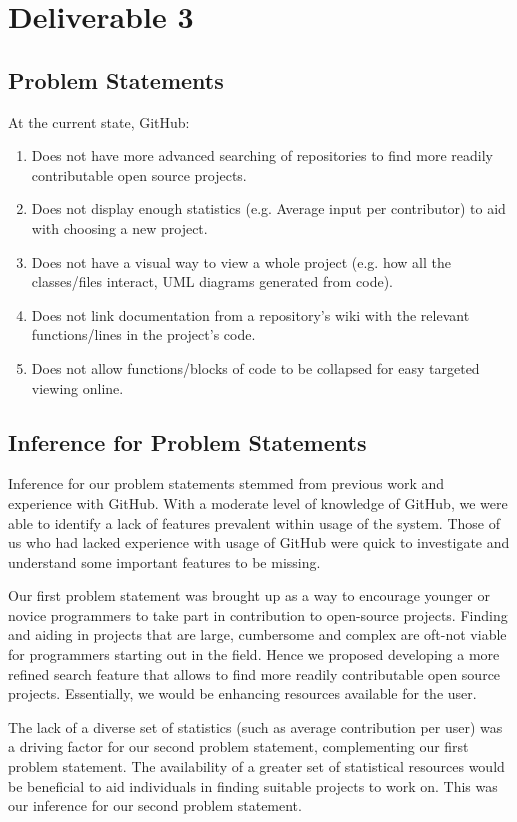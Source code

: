 \documentclass[12pt]{article}
\begin{document}
\setcounter{section}{3}
\setcounter{subsection}{0}
\section*{Deliverable 3}
\subsection{Problem Statements}
At the current state, \textsf{GitHub}:
\begin{enumerate}
\item  Does not have more advanced searching of repositories to find more readily contributable open source projects.
\item Does not display enough statistics (e.g. Average input per contributor) to aid with choosing a new project.
\item Does not  have a visual way to view a whole project (e.g. how all the classes/files interact, UML diagrams generated from code).
\item Does not link documentation from a repository's wiki with the relevant functions/lines in the project's code.
\item Does not allow functions/blocks of code to be collapsed for easy targeted viewing online.
\end{enumerate}

\subsection{Inference for Problem Statements}
Inference for our problem statements stemmed from previous work and experience with \textsf{GitHub}. With a moderate level of knowledge of \textsf{GitHub}, we were able to identify a lack of features prevalent within usage of the system. Those of us who had lacked experience with usage of \textsf{GitHub} were quick to investigate and understand some important features to be missing.

Our first problem statement was brought up as a way to encourage younger or novice programmers to take part in contribution to open-source projects. Finding and aiding in projects that are large, cumbersome and complex are oft-not viable for programmers starting out in the field. Hence we proposed developing a more refined search feature that allows to find more readily contributable open source projects. Essentially, we would be enhancing resources available for the user.

The lack of a diverse set of statistics (such as average contribution per user) was a driving factor for our second problem statement, complementing our first problem statement. The availability of a greater set of statistical resources would be beneficial to aid individuals in finding suitable projects to work on. This was our inference for our second problem statement.
\end{document}
